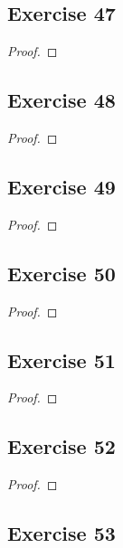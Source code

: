 \documentclass[14pt]{extarticle}
\begin{document}
\subsection{Exercise 47}

\begin{proof}

\end{proof}

\subsection{Exercise 48}

\begin{proof}

\end{proof}

\subsection{Exercise 49}

\begin{proof}

\end{proof}

\subsection{Exercise 50}

\begin{proof}

\end{proof}

\subsection{Exercise 51}

\begin{proof}

\end{proof}

\subsection{Exercise 52}

\begin{proof}

\end{proof}

\subsection{Exercise 53}
\end{document}
